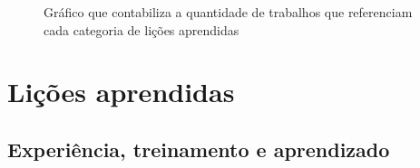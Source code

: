 \begin{figure}[H]
	\centering
	\captionsetup{justification=centering,margin=2cm}
	\caption{Gráfico que contabiliza a quantidade de trabalhos que referenciam cada categoria de lições aprendidas}
	\label{fig:categorias}
\end{figure}

\section{Lições aprendidas}

\subsection{Experiência, treinamento e aprendizado}

